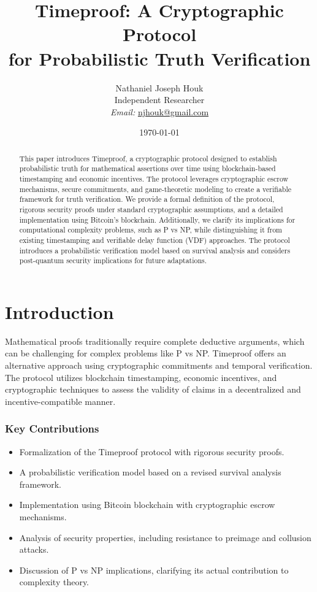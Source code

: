 \documentclass[12pt]{report}
\date{\today}
\begin{document}
\title{Timeproof: A Cryptographic Protocol \\ for Probabilistic Truth Verification}

\author{Nathaniel Joseph Houk\\
Independent Researcher\\
\textit{Email:} \href{mailto:njhouk@gmail.com}{njhouk@gmail.com}}

\maketitle

\begin{abstract}
This paper introduces Timeproof, a cryptographic protocol designed to establish probabilistic truth for mathematical assertions over time using blockchain-based timestamping and economic incentives. The protocol leverages cryptographic escrow mechanisms, secure commitments, and game-theoretic modeling to create a verifiable framework for truth verification. We provide a formal definition of the protocol, rigorous security proofs under standard cryptographic assumptions, and a detailed implementation using Bitcoin's blockchain. Additionally, we clarify its implications for computational complexity problems, such as P vs NP, while distinguishing it from existing timestamping and verifiable delay function (VDF) approaches. The protocol introduces a probabilistic verification model based on survival analysis and considers post-quantum security implications for future adaptations.
\end{abstract}

\chapter{Introduction}

Mathematical proofs traditionally require complete deductive arguments, which can be challenging for complex problems like P vs NP. Timeproof offers an alternative approach using cryptographic commitments and temporal verification. The protocol utilizes blockchain timestamping, economic incentives, and cryptographic techniques to assess the validity of claims in a decentralized and incentive-compatible manner.

\subsection{Key Contributions}
\begin{itemize}
    \item Formalization of the Timeproof protocol with rigorous security proofs.
    \item A probabilistic verification model based on a revised survival analysis framework.
    \item Implementation using Bitcoin blockchain with cryptographic escrow mechanisms.
    \item Analysis of security properties, including resistance to preimage and collusion attacks.
    \item Discussion of P vs NP implications, clarifying its actual contribution to complexity theory.
\end{itemize}
\end{document}
